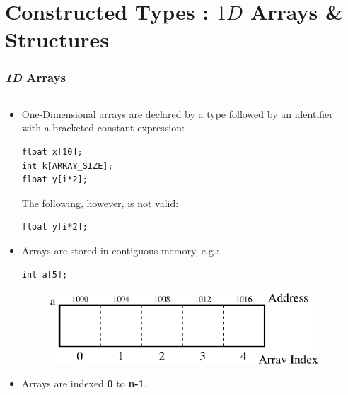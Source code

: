\section{Constructed Types : $1D$ Arrays \& Structures }
\label{chap:contypes}

\begin{frame}[fragile]
\frametitle{{\em 1D} Arrays}
\begin{columns}

\begin{column}{0.55\textwidth}
\begin{itemize}
\item One-Dimensional arrays are declared by a type
followed by an identifier with a bracketed constant expression:
{\small
\begin{verbatim}
float x[10];
int k[ARRAY_SIZE];
float y[i*2];
\end{verbatim}
}
The following, however, is not valid:
{\small
\begin{verbatim}
float y[i*2];
\end{verbatim}
}
\item Arrays are stored in contiguous memory, e.g.:
{\small
\begin{verbatim}
int a[5];
\end{verbatim}
}
\begin{center}
\begin{figure}[h]
\centerline{
\includegraphics[scale=0.40]{../Figs/array9_1.eps}
}
\end{figure}
\end{center}
\item Arrays are indexed {\bf 0} to {\bf n-1}.
\end{itemize}
\end{column}

\begin{column}{0.35\textwidth}

\end{column}

\end{columns}
\end{frame}



